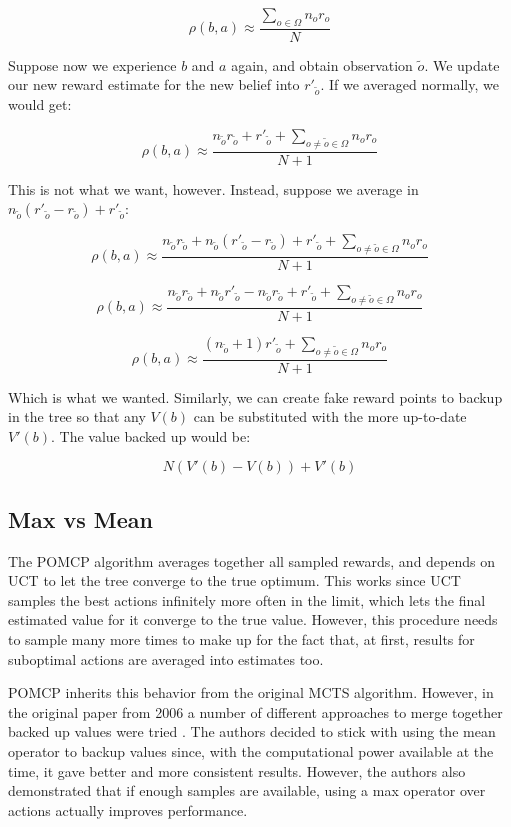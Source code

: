 \[ \rho(b,a) \approx \frac{\sum_{o\in\Omega} n_o r_o}{N} \]

Suppose now we experience $b$ and $a$ again, and obtain observation $\tilde{o}$. We update our new
reward estimate for the new belief into $r'_{\tilde{o}}$. If we averaged normally, we would get:

\[ \rho(b,a) \approx \frac{ n_{\tilde{o}} r_{\tilde{o}} + r'_{\tilde{o}} +
\sum_{o \neq \tilde{o} \in \Omega} n_o r_o}{N+1} \]

This is not what we want, however. Instead, suppose we average in $n_{\tilde{o}}(r'_{\tilde{o}} -
r_{\tilde{o}}) + r'_{\tilde{o}}$:

\[ \rho(b,a) \approx \frac{ n_{\tilde{o}} r_{\tilde{o}} + n_{\tilde{o}}(r'_{\tilde{o}} -
r_{\tilde{o}}) + r'_{\tilde{o}} +
\sum_{o \neq \tilde{o} \in \Omega} n_o r_o}{N+1} \]

\[ \rho(b,a) \approx \frac{ n_{\tilde{o}} r_{\tilde{o}} + n_{\tilde{o}}r'_{\tilde{o}} -
        n_{\tilde{o}} r_{\tilde{o}} + r'_{\tilde{o}} +
\sum_{o \neq \tilde{o} \in \Omega} n_o r_o}{N+1} \]

\[ \rho(b,a) \approx \frac{ ( n_{\tilde{o}}+1) r'_{\tilde{o}} +
\sum_{o \neq \tilde{o} \in \Omega} n_o r_o}{N+1} \]

Which is what we wanted. Similarly, we can create fake reward points to backup in the tree so that
any $V(b)$ can be substituted with the more up-to-date $V'(b)$. The value backed up would be:

\[ N ( V'(b) - V(b) ) + V'(b) \]

\subsection{Max vs Mean}

The POMCP algorithm averages together all sampled rewards, and depends on UCT to let the tree
converge to the true optimum. This works since UCT samples the best actions infinitely more often in
the limit, which lets the final estimated value for it converge to the true value. However, this
procedure needs to sample many more times to make up for the fact that, at first, results for
suboptimal actions are averaged into estimates too.

POMCP inherits this behavior from the original MCTS algorithm. However, in the original paper from
2006 a number of different approaches to merge together backed up values were tried
\cite{cit:mcts}. The authors decided to stick with using the mean operator to backup values since,
with the computational power available at the time, it gave better and more consistent results.
However, the authors also demonstrated that if enough samples are available, using a max operator
over actions actually improves performance.

